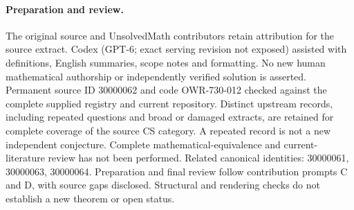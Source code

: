 \documentclass[11pt]{article}
\begin{document}
\paragraph{Preparation and review.}
The original source and UnsolvedMath contributors retain attribution for the source extract. Codex (GPT-6; exact serving revision not exposed) assisted with definitions, English summaries, scope notes and formatting. No new human mathematical authorship or independently verified solution is asserted. Permanent source ID 30000062 and code OWR-730-012 checked against the complete supplied registry and current repository. Distinct upstream records, including repeated questions and broad or damaged extracts, are retained for complete coverage of the source CS category. A repeated record is not a new independent conjecture. Complete mathematical-equivalence and current-literature review has not been performed. Related canonical identities: 30000061, 30000063, 30000064. Preparation and final review follow contribution prompts C and D, with source gaps disclosed. Structural and rendering checks do not establish a new theorem or open status.
\label{end:30000062}
\end{document}

